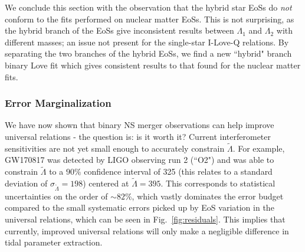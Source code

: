 \documentclass[prd,twocolumn,nofootinbib,superscriptaddress,amsmath,amssymb]{revtex4-1}
\begin{document}
We conclude this section with the observation that the hybrid star EoSs do \emph{not} conform to the fits performed on nuclear matter EoSs.
This is not surprising, as the hybrid branch of the EoSs give inconsistent results between $\Lambda_1$ and $\Lambda_2$ with different masses; an issue not present for the single-star I-Love-Q relations.
By separating the two branches of the hybrid EoSs, we find a new ``hybrid" branch binary Love fit which gives consistent results to that found for the nuclear matter fits.

\subsubsection{Error Marginalization}
We have now shown that binary NS merger observations can help improve universal relations - the question is: is it worth it?
Current interferometer sensitivities are not yet small enough to accurately constrain $\tilde{\Lambda}$.
For example, GW170817 was detected by LIGO observing run 2 (``O2") and was able to constrain $\tilde{\Lambda}$ to a $90\%$ confidence interval of 325 (this relates to a standard deviation of $\sigma_{\tilde{\Lambda}}=198$) centered at $\tilde{\Lambda}=395$.
This corresponds to statistical uncertainties on the order of $\sim 82\%$, which vastly dominates the error budget compared to the small systematic errors picked up by EoS variation in the universal relations, which can be seen in Fig.~\ref{fig:residuals}.
This implies that currently, improved universal relations will only make a negligible difference in tidal parameter extraction.
\end{document}
